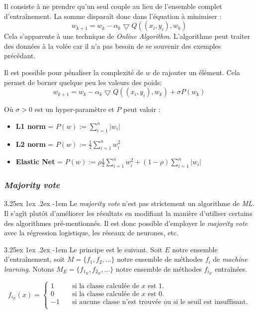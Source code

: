 \documentclass[a4paper, 11pt]{article}
\makeatletter
\renewcommand\paragraph{\@startsection{paragraph}{5}{\z@}%
  {3.25ex \@plus1ex \@minus.2ex}%
  {-1em}%
  {\normalfont\normalsize\bfseries}}
\makeatother
\begin{document}
Il consiste à ne prendre qu'un seul couple au lieu de l'ensemble complet d'entraînement. La somme disparaît donc dans l'équation à minimiser :
$$w_{k+1} = w_k -\alpha_k \bigtriangledown Q ((x_i,y_i), w_k)$$
Cela s'apparente à une technique de \textit{Online Algorithm}. L'algorithme peut traiter des données à la volée car il n'a pas
besoin de se souvenir des exemples précédant.

Il est possible pour pénaliser la complexité de $w$ de rajouter un élément. Cela permet de borner quelque peu les valeurs des poids:
$$w_{k+1} = w_k -\alpha_k \bigtriangledown Q ((x_i,y_i), w_k) + \sigma P(w_k)$$

Où $\sigma > 0$ est un hyper-paramètre et $P$ peut valoir :
\begin{itemize}
\item \textbf{L1 norm} = $P(w) := \sum\limits_{i=1}^n |w_i|$
\item \textbf{L2 norm} = $P(w) := \frac{1}{2}\sum\limits_{i=1}^n w_i^2$
\item \textbf{Elastic Net} = $P(w) := \rho \frac{1}{2}\sum\limits_{i=1}^n w_i^2 + (1 - \rho) \sum\limits_{i=1}^n |w_i|$
\end{itemize}


\subsubsection{\textit{Majority vote}} \label{section majority vote}
\paragraph{}
Le \textit{majority vote} n'est pas strictement un algorithme de \textit{ML}. Il s'agît plutôt d'améliorer les résultats
en modifiant la manière d'utiliser certains des algorithmes pré-mentionnés.
Il est donc possible d'employer le \textit{majority vote} avec la régression logistique, les réseaux de neurones, etc.

\paragraph{}
Le principe est le suivant. Soit $E$ notre ensemble d'entraînement, soit $M = \{f_1, f_2, ...\}$ notre ensemble de
méthodes $f_i$ de \textit{machine learning}. Notons $M_E = \{f_{1_E}, f_{2_E}, ...\}$ notre ensemble de
méthodes $f_{i_E}$ entraînées.
 
\[ f_{i_E}(x) =
  \begin{cases}
    1       & \quad \text{si la classe calculée de $x$ est 1.}\\
    0  & \quad \text{si la classe calculée de $x$ est 0.}\\
    -1 & \quad \text{si aucune classe n'est trouvée ou si le seuil est insuffisant.}\\
  \end{cases}
\]
\end{document}
